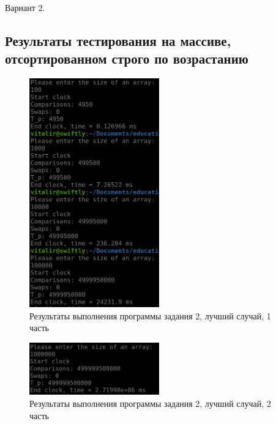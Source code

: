 \documentclass[14pt]{extarticle}
\begin{document}
Вариант 2.
\newpage
\subsection{Результаты тестирования на массиве, отсортированном строго по возрастанию}

\begin{figure}[htpb]
  \centering
  \includegraphics[width=0.5\textwidth]{pictures/alg2_speed1.png}
  \caption{Результаты выполнения программы задания 2, лучший случай, 1 часть}
  \label{fig:alg2_speed1_best}
\end{figure}

\begin{figure}[htpb]
  \centering
  \includegraphics[width=0.5\textwidth]{pictures/alg2_speed2.png}
  \caption{Результаты выполнения программы задания 2, лучший случай, 2 часть}
  \label{fig:alg2_speed2_best}
\end{figure}
\end{document}
